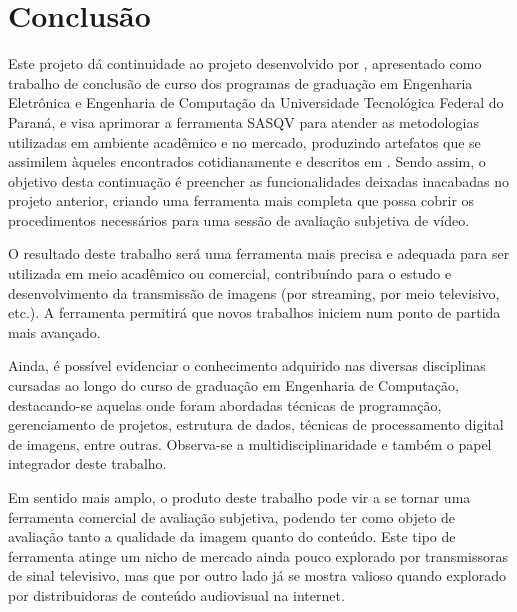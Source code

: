 \chapter{Conclusão}

Este projeto dá continuidade ao projeto desenvolvido por \cite{sasqv}, apresentado como trabalho de conclusão de curso dos programas de graduação em Engenharia Eletrônica e Engenharia de Computação da Universidade Tecnológica Federal do Paraná, e visa aprimorar a ferramenta SASQV para atender as metodologias utilizadas em ambiente acadêmico e no mercado, produzindo artefatos que se assimilem àqueles encontrados cotidianamente e descritos em \cite{albini, vqeg}. 
Sendo assim, o objetivo desta continuação é preencher as funcionalidades deixadas inacabadas no projeto anterior, criando uma ferramenta mais completa que possa cobrir os procedimentos necessários para uma sessão de avaliação subjetiva de vídeo.

O resultado deste trabalho será uma ferramenta mais precisa e adequada para ser utilizada em meio acadêmico ou comercial, contribuíndo para o estudo e desenvolvimento da transmissão de imagens (por streaming, por meio televisivo, etc.). A ferramenta permitirá que novos trabalhos iniciem num ponto de partida mais avançado. 

Ainda, é possível evidenciar o conhecimento adquirido nas diversas disciplinas cursadas ao longo do curso de graduação em Engenharia de Computação, destacando-se aquelas onde foram abordadas técnicas de programação, gerenciamento de projetos, estrutura de dados, técnicas de processamento digital de imagens, entre outras. Observa-se a multidisciplinaridade e também o papel integrador deste trabalho.

Em sentido mais amplo, o produto deste trabalho pode vir a se tornar uma ferramenta comercial de avaliação subjetiva, podendo ter como objeto de avaliação tanto a qualidade da imagem quanto do conteúdo. Este tipo de ferramenta atinge um nicho de mercado ainda pouco explorado por transmissoras de sinal televisivo, mas que por outro lado já se mostra valioso quando explorado por distribuidoras de conteúdo audiovisual na internet.
